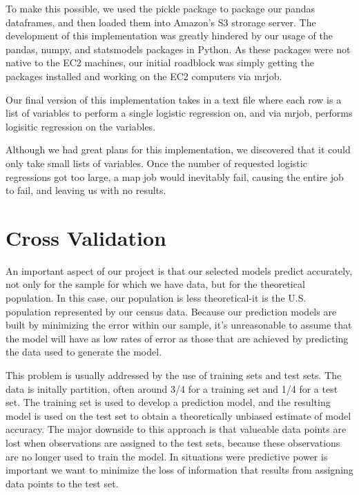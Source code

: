 \documentclass[11pt]{article}
\begin{document}
To make this possible, we used the pickle package to package our pandas dataframes, and then loaded them into Amazon's S3 strorage server. The development of this implementation was greatly hindered by our usage of the pandas, numpy, and statsmodels packages in Python. As these packages were not native to the EC2 machines, our initial roadblock was simply getting the packages installed and working on the EC2 computers via mrjob.

Our final version of this implementation takes in a text file where each row is a list of variables to perform a single logistic regression on, and via mrjob, performs logisitic regression on the variables.

Although we had great plans for this implementation, we discovered that it could only take small lists of variables. Once the number of requested logistic regressions got too large, a map job would inevitably fail, causing the entire job to fail, and leaving us with no results.


\section{Cross Validation}
An important aspect of our project is that our selected models predict accurately, not only for the sample for which we have data, but for the theoretical population. In this case, our population is less theoretical-it is the U.S. population represented by our census data. Because our prediction models are built by minimizing the error within our sample, it's unreasonable to assume that the model will have as low rates of error as those that are achieved by predicting the data used to generate the model.


This problem is usually addressed by the use of training sets and test sets. The data is initally partition, often around 3/4 for a training set and 1/4 for a test set. The training set is used to develop a prediction model, and the resulting model is used on the test set to obtain a theoretically unbiased estimate of model accuracy. The major downside to this approach is that valueable data points are lost when observations are assigned to the test sets, because these observations are no longer used to train the model. In situations were predictive power is important we want to minimize the loss of information that results from assigning data points to the test set. 
\end{document}
